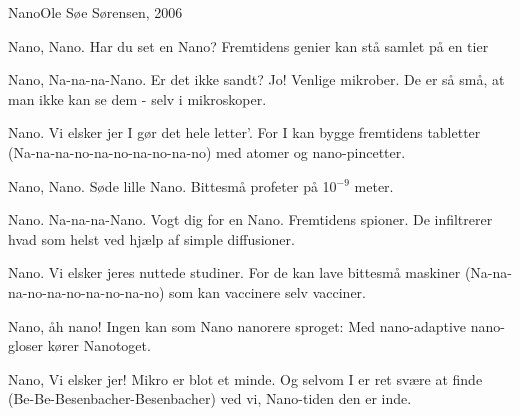 \begin{sang}{Nano}{Ole Søe Sørensen, 2006}%
\begin{vers}
Nano, Nano.
\verseend
Har du set en Nano?
\verseend
Fremtidens genier
\verseend
kan stå samlet på en tier
\end{vers}
\begin{vers}
Nano, Na-na-na-Nano.
\verseend
Er det ikke sandt? Jo!
\verseend
Venlige mikrober.
\verseend
De er så små, at man ikke
\verseend
kan se dem - selv i mikroskoper.
\end{vers}
\begin{omkvaed}
Nano. Vi elsker jer
\verseend
I gør det hele letter'.
\verseend
For I kan bygge fremtidens tabletter
\verseend
(Na-na-na-no-na-no-na-no-na-no)
\verseend
med atomer og nano-pincetter.
\end{omkvaed}
\begin{vers}
Nano, Nano.
\verseend
Søde lille Nano.
\verseend
Bittesmå profeter
\verseend
på 10$^{-9}$ meter.
\end{vers}
\begin{vers}
Nano. Na-na-na-Nano.
\verseend
Vogt dig for en Nano.
\verseend
Fremtidens spioner.
\verseend
De infiltrerer hvad som helst
\verseend
ved hjælp af simple diffusioner.
\end{vers}
\begin{omkvaed}
Nano. Vi elsker jeres
\verseend
nuttede studiner.
\verseend
For de kan lave bittesmå maskiner
\verseend
(Na-na-na-no-na-no-na-no-na-no)
\verseend
som kan vaccinere selv vacciner.
\end{omkvaed}
\begin{vers}
Nano, åh nano!
\verseend
Ingen kan som Nano
\verseend
nanorere sproget:
\verseend
Med nano-adaptive nano-
\verseend
gloser kører Nanotoget.
\end{vers}
\begin{omkvaed}
Nano, Vi elsker jer!
\verseend
Mikro er blot et minde.
\verseend
Og selvom I er ret svære at finde
\verseend
(Be-Be-Besenbacher-Besenbacher)
\verseend
ved vi, Nano-tiden den er inde.
\end{omkvaed}
\end{sang}
